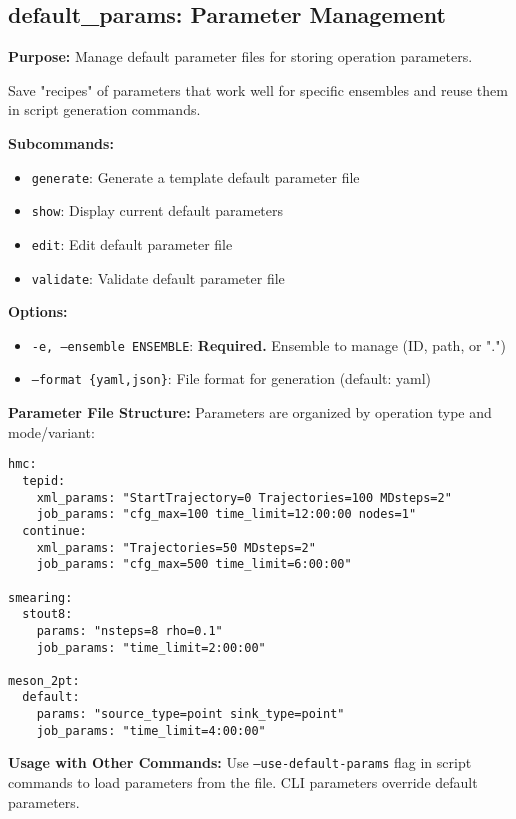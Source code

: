 \documentclass{article}
\begin{document}
\subsection{default\_params: Parameter Management}

\textbf{Purpose:} Manage default parameter files for storing operation parameters.

Save "recipes" of parameters that work well for specific ensembles and reuse them in script generation commands.

\textbf{Subcommands:}
\begin{itemize}
\item \texttt{generate}: Generate a template default parameter file
\item \texttt{show}: Display current default parameters  
\item \texttt{edit}: Edit default parameter file
\item \texttt{validate}: Validate default parameter file
\end{itemize}

\textbf{Options:}
\begin{itemize}
\item \texttt{-e, --ensemble ENSEMBLE}: \textbf{Required.} Ensemble to manage (ID, path, or ".")
\item \texttt{--format \{yaml,json\}}: File format for generation (default: yaml)
\end{itemize}

\textbf{Parameter File Structure:}
Parameters are organized by operation type and mode/variant:

\begin{lstlisting}
hmc:
  tepid:
    xml_params: "StartTrajectory=0 Trajectories=100 MDsteps=2"
    job_params: "cfg_max=100 time_limit=12:00:00 nodes=1"
  continue:
    xml_params: "Trajectories=50 MDsteps=2"
    job_params: "cfg_max=500 time_limit=6:00:00"
    
smearing:
  stout8:
    params: "nsteps=8 rho=0.1"
    job_params: "time_limit=2:00:00"

meson_2pt:
  default:
    params: "source_type=point sink_type=point"
    job_params: "time_limit=4:00:00"
\end{lstlisting}

\textbf{Usage with Other Commands:}
Use \texttt{--use-default-params} flag in script commands to load parameters from the file. CLI parameters override default parameters.
\end{document}
